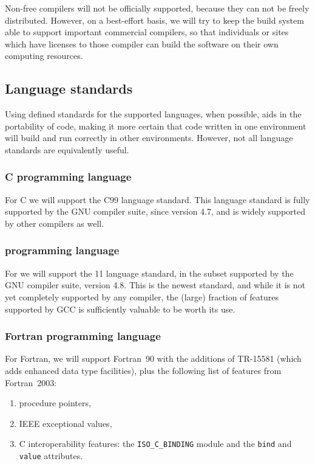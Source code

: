 \documentclass{memarticle}
\begin{document}
Non-free compilers will not be officially supported, because they can
not be freely distributed. However, on a best-effort basis, we will try
to keep the build system able to support important commercial compilers,
so that individuals or sites which have licenses to those compiler can
build the software on their own computing resources.

\subsection{Language standards}

Using defined standards for the supported languages, when possible, aids
in the portability of code, making it more certain that code written in
one environment will build and run correctly in other environments.
However, not all language standards are equivalently useful.

\subsubsection{C programming language}

For C we will support the C99 language standard. This language standard
is fully supported by the GNU compiler suite, since version 4.7, and is widely
supported by other compilers as well.

\subsubsection{\cpp{} programming language}

For \cpp{} we will support the \cpp{}11 language standard, in the subset
supported by the GNU compiler suite, version 4.8. This is the newest
\cpp{} standard, and while it is not yet completely supported by any
compiler, the (large) fraction of features supported by GCC is
sufficiently valuable to be worth its use.

\subsubsection{Fortran programming language}

For Fortran, we will support Fortran~90 with the additions of TR-15581
(which adds enhanced data type facilities), plus the following list of
features from Fortran~2003:
\begin{enumerate}
\item procedure pointers,
\item IEEE exceptional values,
\item C interoperability features: the \texttt{ISO\_C\_BINDING} module
  and the \texttt{bind} and \texttt{value} attributes.
\end{enumerate}
\end{document}
